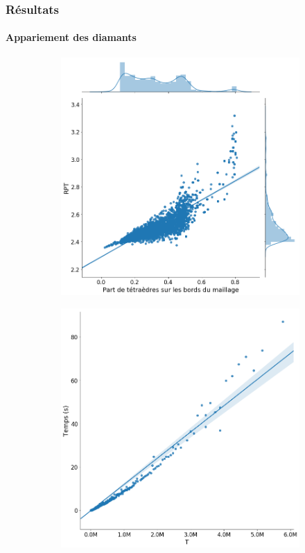 \documentclass[9pt]{beamer}
\begin{document}
\begin{frame}
\small
\frametitle{Résultats}
\framesubtitle{Appariement des diamants}
\small
\begin{figure}[H]
\centering
\begin{subfigure}{.5\textwidth}
  \centering
  \includegraphics[scale=0.18]{Images/boundary_RPT}
  \caption{}
\end{subfigure}%
\begin{subfigure}{.5\textwidth}
  \centering
  \includegraphics[scale=0.18]{Images/T_time}

\end{subfigure}
\end{figure}
\end{frame}
\end{document}
